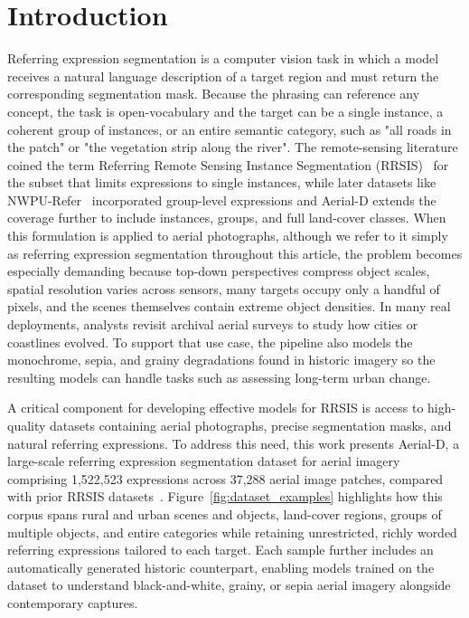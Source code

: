 
\section{Introduction}
\label{sec:intro}

Referring expression segmentation is a computer vision task in which a model receives a natural language description of a target region and must return the corresponding segmentation mask. Because the phrasing can reference any concept, the task is open-vocabulary and the target can be a single instance, a coherent group of instances, or an entire semantic category, such as "all roads in the patch" or "the vegetation strip along the river". The remote-sensing literature coined the term Referring Remote Sensing Instance Segmentation (RRSIS)~\cite{yuan2023rrsis} for the subset that limits expressions to single instances, while later datasets like NWPU-Refer~\cite{yang2024large} incorporated group-level expressions and Aerial-D extends the coverage further to include instances, groups, and full land-cover classes. When this formulation is applied to aerial photographs, although we refer to it simply as referring expression segmentation throughout this article, the problem becomes especially demanding because top-down perspectives compress object scales, spatial resolution varies across sensors, many targets occupy only a handful of pixels, and the scenes themselves contain extreme object densities. In many real deployments, analysts revisit archival aerial surveys to study how cities or coastlines evolved. To support that use case, the pipeline also models the monochrome, sepia, and grainy degradations found in historic imagery so the resulting models can handle tasks such as assessing long-term urban change.

A critical component for developing effective models for RRSIS is access to high-quality datasets containing aerial photographs, precise segmentation masks, and natural referring expressions. To address this need, this work presents Aerial-D, a large-scale referring expression segmentation dataset for aerial imagery comprising 1,522,523 expressions across 37,288 aerial image patches, compared with prior RRSIS datasets~\cite{yuan2023rrsis,liu2024rotated,yang2024large}. Figure~\ref{fig:dataset_examples} highlights how this corpus spans rural and urban scenes and objects, land-cover regions, groups of multiple objects, and entire categories while retaining unrestricted, richly worded referring expressions tailored to each target. Each sample further includes an automatically generated historic counterpart, enabling models trained on the dataset to understand black-and-white, grainy, or sepia aerial imagery alongside contemporary captures.

